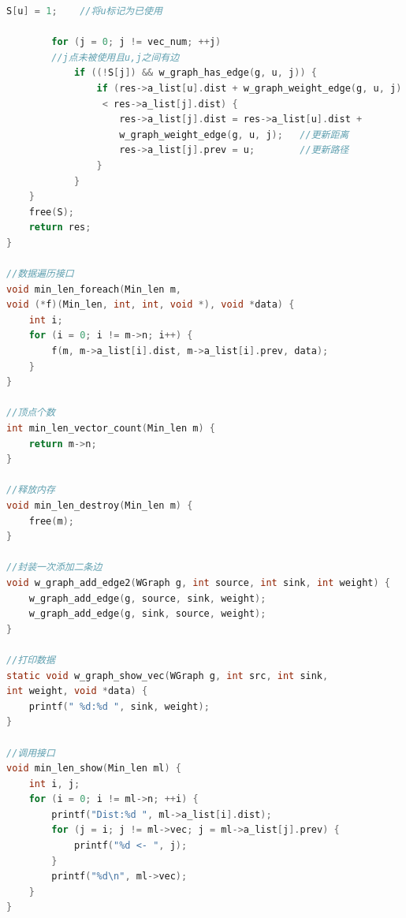 \documentclass[a4paper,10pt]{ctexart}
\begin{document}
\begin{lstlisting}[language={C}]
        S[u] = 1;    //将u标记为已使用

        for (j = 0; j != vec_num; ++j)
        //j点未被使用且u,j之间有边
            if ((!S[j]) && w_graph_has_edge(g, u, j)) {
                if (res->a_list[u].dist + w_graph_weight_edge(g, u, j)
                 < res->a_list[j].dist) {
                    res->a_list[j].dist = res->a_list[u].dist +
                    w_graph_weight_edge(g, u, j);   //更新距离
                    res->a_list[j].prev = u;        //更新路径
                }
            }
    }
    free(S);
    return res;
}

//数据遍历接口
void min_len_foreach(Min_len m,
void (*f)(Min_len, int, int, void *), void *data) {
    int i;
    for (i = 0; i != m->n; i++) {
        f(m, m->a_list[i].dist, m->a_list[i].prev, data);
    }
}

//顶点个数
int min_len_vector_count(Min_len m) {
    return m->n;
}

//释放内存
void min_len_destroy(Min_len m) {
    free(m);
}

//封装一次添加二条边
void w_graph_add_edge2(WGraph g, int source, int sink, int weight) {
    w_graph_add_edge(g, source, sink, weight);
    w_graph_add_edge(g, sink, source, weight);
}

//打印数据
static void w_graph_show_vec(WGraph g, int src, int sink,
int weight, void *data) {
    printf(" %d:%d ", sink, weight);
}

//调用接口
void min_len_show(Min_len ml) {
    int i, j;
    for (i = 0; i != ml->n; ++i) {
        printf("Dist:%d ", ml->a_list[i].dist);
        for (j = i; j != ml->vec; j = ml->a_list[j].prev) {
            printf("%d <- ", j);
        }
        printf("%d\n", ml->vec);
    }
}
\end{lstlisting}
\end{document}
